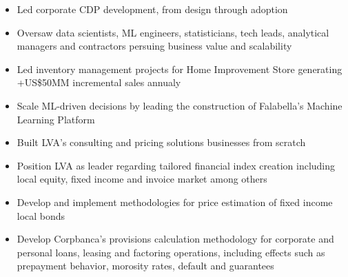 \documentclass[10pt,a4paper,ragged2e,withhyper]{altacv}
\begin{document}
\begin{paracol}{2}



\begin{itemize}
\item Led corporate CDP development, from design through adoption
\item Oversaw data scientists, ML engineers, statisticians, tech leads, analytical managers and contractors persuing business value and scalability 
\item Led inventory management projects for Home Improvement Store generating +US\$50MM incremental sales annualy
\item Scale ML-driven decisions by leading the construction of Falabella's Machine Learning Platform
\end{itemize}

\medskip

\begin{itemize}
\item Built LVA's consulting and pricing solutions businesses from scratch
\item Position LVA as leader regarding tailored financial index creation including local equity, fixed income and invoice market among others
\end{itemize}

\medskip

\begin{itemize}
\item Develop and implement methodologies for price estimation of fixed income local bonds

\end{itemize}

\medskip

\begin{itemize}
\item Develop Corpbanca's provisions calculation methodology for corporate and personal loans, leasing and factoring operations, including effects such as prepayment behavior, morosity rates, default and guarantees


\end{itemize}
\end{paracol}
\end{document}
